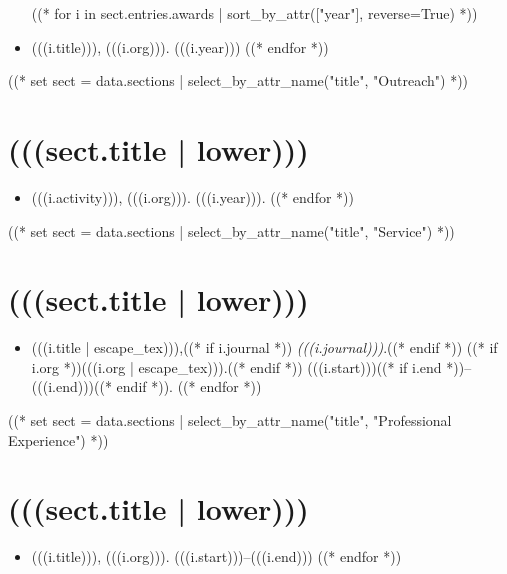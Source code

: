 \documentclass[11pt,article,oneside]{memoir}
\begin{document}
\begin{itemize}[label={}]
((* for i in sect.entries.awards | sort_by_attr(["year"], reverse=True) *))
\item (((i.title))), (((i.org))). (((i.year)))
((* endfor *))
\end{itemize}

((* set sect = data.sections | select_by_attr_name("title", "Outreach") *))
\section{(((sect.title | lower)))}

\mbox{}\vspace{-\dimexpr\baselineskip\relax}

\begin{itemize}[label={}]
((* for i in sect.entries.outreach | sort_last_year("year", reverse=True) *))
\item (((i.activity))), (((i.org))). (((i.year))).
((* endfor *))
\end{itemize}

((* set sect = data.sections | select_by_attr_name("title", "Service") *))
\section{(((sect.title | lower)))}

\mbox{}\vspace{-\dimexpr\baselineskip\relax}

\begin{itemize}[label={}]
((* for i in sect.entries.service *))
\item (((i.title | escape_tex))),((* if i.journal *)) \emph{(((i.journal)))}.((* endif *)) ((* if i.org *))(((i.org | escape_tex))).((* endif *)) (((i.start)))((* if i.end *))--(((i.end)))((* endif *)).
((* endfor *))
\end{itemize}

((* set sect = data.sections | select_by_attr_name("title", "Professional Experience") *))
\section{(((sect.title | lower)))}

\mbox{}\vspace{-\dimexpr\baselineskip\relax}

\begin{itemize}[label={}]
((* for i in sect.entries.experience | sort_by_attr(["end", "start"], reverse=True) *))
\item (((i.title))), (((i.org))). (((i.start)))--(((i.end)))
((* endfor *))
\end{itemize}
\end{document}
